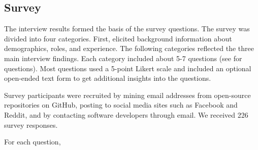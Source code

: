 \subsection{Survey}

The interview results formed the basis of the survey questions. The survey was divided into four categories. First, elicited background information about demographics, roles, and experience. The following categories reflected the three main interview findings. Each category included about 5-7 questions (see \cite{companion_site} for questions). Most questions used a 5-point Likert scale and included an optional open-ended text form to get additional insights into the questions. 

Survey participants were recruited by mining email addresses from open-source repositories on GitHub, posting to social media sites such as Facebook and Reddit, and by contacting software developers through email. We received 226 survey responses.

For each question, 